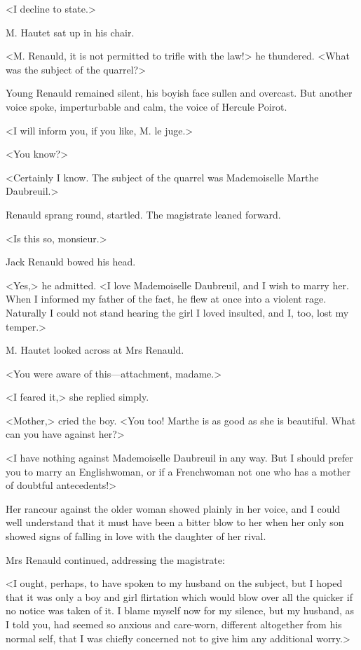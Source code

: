  <I decline to state.> 

 M. Hautet sat up in his chair. 

 <M. Renauld, it is not permitted to trifle with the law!> he thundered. <What was the subject of the quarrel?> 

 Young Renauld remained silent, his boyish face sullen and overcast. But another voice spoke, imperturbable and calm, the voice of Hercule Poirot. 

 <I will inform you, if you like, M. le juge.> 

 <You know?> 

 <Certainly I know. The subject of the quarrel was Mademoiselle Marthe Daubreuil.> 

 Renauld sprang round, startled. The magistrate leaned forward. 

 <Is this so, monsieur.> 

 Jack Renauld bowed his head. 

 <Yes,> he admitted. <I love Mademoiselle Daubreuil, and I wish to marry her. When I informed my father of the fact, he flew at once into a violent rage. Naturally I could not stand hearing the girl I loved insulted, and I, too, lost my temper.> 

 M. Hautet looked across at Mrs Renauld. 

 <You were aware of this—attachment, madame.> 

 <I feared it,> she replied simply. 

 <Mother,> cried the boy. <You too! Marthe is as good as she is beautiful. What can you have against her?> 

 <I have nothing against Mademoiselle Daubreuil in any way. But I should prefer you to marry an Englishwoman, or if a Frenchwoman not one who has a mother of doubtful antecedents!> 

 Her rancour against the older woman showed plainly in her voice, and I could well understand that it must have been a bitter blow to her when her only son showed signs of falling in love with the daughter of her rival. 

 Mrs Renauld continued, addressing the magistrate: 

 <I ought, perhaps, to have spoken to my husband on the subject, but I hoped that it was only a boy and girl flirtation which would blow over all the quicker if no notice was taken of it. I blame myself now for my silence, but my husband, as I told you, had seemed so anxious and care-worn, different altogether from his normal self, that I was chiefly concerned not to give him any additional worry.> 

